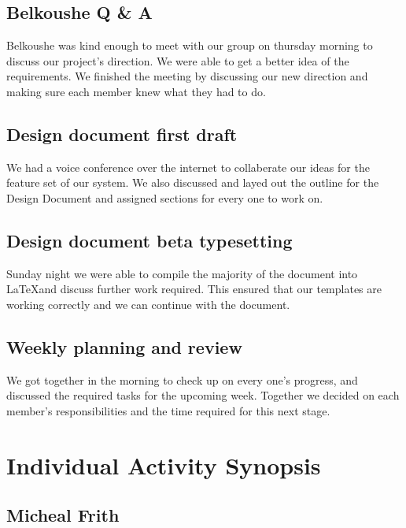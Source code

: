 \documentclass[12pt,article,compsoc]{IEEEtran}
\begin{document}
	\subsection{Belkoushe Q \& A}
                Belkoushe was kind enough to meet with our group on thursday morning to discuss our project's
                direction. We were able to get a better idea of the requirements. We finished the meeting
                by discussing our new direction and making sure each member knew what they had to do.
                
	\subsection{Design document first draft}
                We had a voice conference over the internet to collaberate our ideas for the feature set of our
                system. We also discussed and layed out the outline for the Design Document and assigned sections
                for every one to work on. 
	
	\subsection{Design document beta typesetting}
                Sunday night we were able to compile the majority of the document into \LaTeX and discuss further
                work required. This ensured that our templates are working correctly and we can continue with the
                document.
	
	\subsection{Weekly planning and review }
                We got together in the morning to check up on every one's progress, and discussed the required tasks
                for the upcoming week. Together we decided on each member's responsibilities and the time required
                for this next stage.
	
\section{Individual Activity Synopsis}
	\subsection{Micheal Frith}
\end{document}
